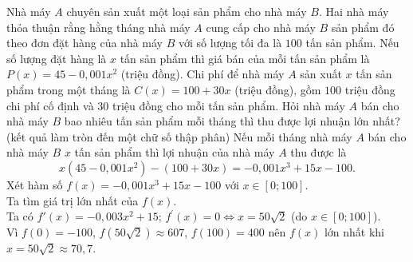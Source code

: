 \begin{ex}%
    Nhà máy $A$ chuyên sản xuất một loại sản phẩm cho nhà máy $B$. Hai nhà máy thỏa thuận rằng hằng tháng nhà máy $A$ cung cấp cho nhà máy $B$ sản phẩm đó theo đơn đặt hàng của nhà máy $B$ với số lượng tối đa là $100$ tấn sản phẩm. Nếu số lượng đặt hàng là $x$ tấn sản phẩm thì giá bán của mỗi tấn sản phẩm là $P(x)=45-0,001 x^2$ (triệu đồng). Chi phí để nhà máy $A$ sản xuất $x$ tấn sản phẩm trong một tháng là $C(x)=100+30 x$ (triệu đồng), gồm $100$ triệu đồng chi phí cố định và $30$ triệu đồng cho mỗi tấn sản phẩm. Hỏi nhà máy $A$ bán cho nhà máy $B$ bao nhiêu tấn sản phẩm mỗi tháng thì thu được lợi nhuận lớn nhất? (kết quả làm tròn đến một chữ số thập phân)
    \loigiai
    {Nếu mỗi tháng nhà máy $A$ bán cho nhà máy $B$ $x$ tấn sản phẩm thì lợi nhuận của nhà máy $A$ thu được là
        $$
        x\left(45-0{,}001 x^2\right)-(100+30 x)=-0{,}001 x^3+15 x-100.
        $$
        Xét hàm số $f(x)=-0{,}001 x^3+15 x-100$ với $x \in[0; 100]$.\\
        Ta tìm giá trị lớn nhất của $f(x)$.\\
        Ta có $f'(x)=-0{,}003 x^2+15$; $f^{\prime}(x)=0 \Leftrightarrow x=50 \sqrt{2}$ (do $x \in[0; 100]$).\\
        Vì $f(0)=-100$, $f(50 \sqrt{2}) \approx 607$, $f(100)=400$ nên $f(x)$ lớn nhất khi $x=50 \sqrt{2} \approx 70{,}7$.
    }
\end{ex}

